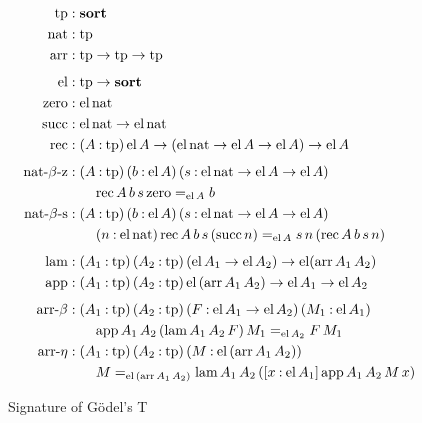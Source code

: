 \documentclass[11pt,twoside]{article}
\newcommand{\parens}[1]{(#1)}
\newcommand{\sortclass}{\ensuremath{\textbf{sort}}}
\newcommand{\eqclass}[3]{{#2}=_{#1}{#3}}
\newcommand{\piclass}[3]{({#2}\mathbin{:}{#1})\,{#3}}
\newcommand{\arrclass}[2]{{#1}\to{#2}}
\newcommand{\lamobj}[3]{[{#2}\mathbin{:}{#1}]\,{#3}}
\newcommand{\appobj}[2]{{#1}\,{#2}}
\begin{document}
\begin{figure}
  
  \begin{align*}
    \tpsort
    & : \sortclass \\
    \nattp
    & : \tpsort \\
    \arrtp
    & : \arrclass{\tpsort}{\arrclass{\tpsort}{\tpsort}} \\[1ex]
    \elfam
%
    & : \arrclass{\tpsort}{\sortclass} \\
    \zerocon
    & : \elof{\nattp} \\
    \succcon
    & : \arrclass {\elof{\nattp}}{\elof{\nattp}} \\
    \reccon
    &  :
      \piclass{\tpsort}{A}{
      \arrclass{\elof{A}}{
      \arrclass{\parens{\arrclass{\elof{\nattp}}{\arrclass{\elof{A}}{\elof{A}}}}}{
      \elof{A}}}} \\[1ex] 
%
    \reczcon
    & :
      \piclass{\tpsort}{A}{
      \piclass{\elof{A}}{b}{
      \piclass{\arrclass{\elof{\nattp}}{\arrclass{\elof{A}}{\elof{A}}}}{s}{
      }}} \\
    & \qquad
      \eqclass{\elof{A}}{\recof{A}{b}{s}{\zerocon}}{b} \\
    \recscon
    & :
      \piclass{\tpsort}{A}{
      \piclass{\elof{A}}{b}{
      \piclass{\arrclass{\elof{\nattp}}{\arrclass{\elof{A}}{\elof{A}}}}{s}{
      }}} \\
    & \qquad
      \piclass{\elof{\nattp}}{n}{
      \eqclass{\elof{A}}
      {\recof{A}{b}{s}{\parens{\succof{n}}}}
      {\appobj{\appobj{s}{n}}{\parens{\recof{A}{b}{s}{n}}}}} \\[1ex]
%
    \lamcon
    & :
      \piclass{\tpsort}{A_{1}}{
      \piclass{\tpsort}{A_{2}}{
      \arrclass{\parens{\arrclass{\elof{A_{1}}}{\elof{A_{2}}}}}{
      \elfam{\parens{\arrof{A_{1}}{A_{2}}}}}}} \\
    \appcon
    & :
      \piclass{\tpsort}{A_{1}}{
      \piclass{\tpsort}{A_{2}}{
      \arrclass{\elofp{\arrof{A_{1}}{A_{2}}}}{
      \arrclass{\elof{A_{1}}}{\elof{A_{2}}}}}} \\[1ex]
%
    \betacon
    & :
      \piclass{\tpsort}{A_{1}}{
      \piclass{\tpsort}{A_{2}}{
      \piclass{\arrclass{\elof{A_{1}}}{\elof{A_{2}}}}{F}{
      \piclass{\elof{A_{1}}}{M_1}{
      }}}} \\
    & \qquad
      \eqclass{\elof{A_{2}}}
      {\appof{A_{1}}{A_{2}}{\parens{\lamof{A_{1}}{A_{2}}{F}}}{M_1}}
      {\appobj{F}{M_1}} \\
    \etacon
    & :
      \piclass{\tpsort}{A_{1}}{
      \piclass{\tpsort}{A_{2}}{
      \piclass{\elofp{\arrof{A_{1}}{A_{2}}}}{M}{
      }}} \\
    & \qquad
      \eqclass{\elofp{\arrof{A_{1}}{A_{2}}}}
      {M}
      {\lamof{A_{1}}{A_{2}}{\parens{\lamobj{\elof{A_{1}}}{x}{\appof{A_{1}}{A_{2}}{M}{x}}}}}
  \end{align*}

  \caption{Signature of G\"odel's T}
  \label{fig:t-sig}
\end{figure}
\end{document}

